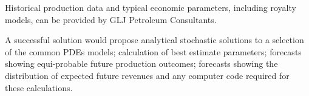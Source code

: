 \documentclass[12pt,a4paper]{article}
\begin{document}
Historical production data and typical economic parameters, including royalty models, can be provided by GLJ Petroleum Consultants.

A successful solution would propose analytical stochastic solutions to a selection of the common PDEs models; calculation of best estimate parameters; forecasts showing equi-probable future production outcomes; forecasts showing the distribution of expected future revenues and any computer code required for these calculations.
\end{document}
